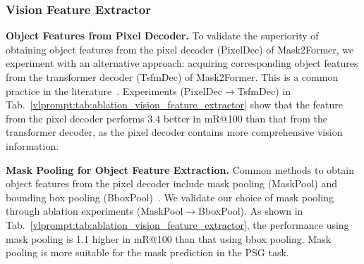\subsubsection{Vision Feature Extractor}

\begin{table}[!t]
    \centering
    \setlength{\tabcolsep}{2.8mm}
    \caption{Ablation study for the Vision Feature Extractor.}
    \label{vlprompt:tab:ablation_vision_feature_extractor}
\end{table}

\noindent \textbf{Object Features from Pixel Decoder.}
To validate the superiority of obtaining object features from the pixel decoder (PixelDec) of Mask2Former, we experiment with an alternative approach: acquiring corresponding object features from the transformer decoder (TsfmDec) of Mask2Former. This is a common practice in the literature~\citep{cong2023reltr}.
Experiments (PixelDec$\rightarrow$TsfmDec) in Tab.~\ref{vlprompt:tab:ablation_vision_feature_extractor} show that the feature from the pixel decoder performs 3.4 better in mR@100 than that from the transformer decoder, as the pixel decoder contains more comprehensive vision information.

\noindent \textbf{Mask Pooling for Object Feature Extraction.}
Common methods to obtain object features from the pixel decoder include mask pooling (MaskPool) and bounding box pooling (BboxPool)~\citep{girshick2015fast}.
We validate our choice of mask pooling through ablation experiments (MaskPool$\rightarrow$BboxPool).
As shown in Tab.~\ref{vlprompt:tab:ablation_vision_feature_extractor}, the performance using mask pooling is 1.1 higher in mR@100 than that using bbox pooling.
Mask pooling is more suitable for the mask prediction in the PSG task. 

